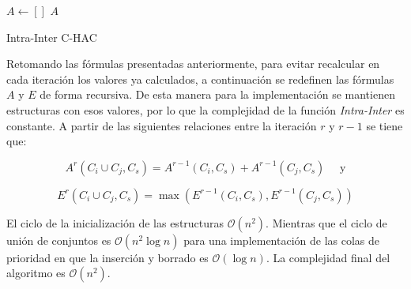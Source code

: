 \begin{center}
	\begin{algorithm}[H]
	\DontPrintSemicolon
	\SetAlgoLined
		$A \leftarrow []$\;
		\Return $A$\;
	\caption{Intra-Inter C-HAC}\label{alg:Intra-Inter C-HAC}
	\end{algorithm}
\end{center}

Retomando las fórmulas presentadas anteriormente, para evitar recalcular en cada iteración los valores ya calculados, a continuación se redefinen las fórmulas $A$ y $E$ de forma recursiva. De esta manera para la implementación se mantienen estructuras con esos valores, por lo que la complejidad de la función \textit{Intra-Inter} es constante. A partir de las siguientes relaciones entre la iteración $r$ y $r-1$ se tiene que:

$$A^r(C_i \cup C_j, C_s) = A^{r-1}(C_i,C_s) + A^{r-1}(C_j,C_s) \quad \mbox{ y}$$

$$E^r(C_i \cup C_j,C_s) = \max (E^{r-1}(C_i,C_s),E^{r-1}(C_j,C_s))$$

El ciclo de la inicialización de las estructuras $\mathcal{O}(n^{2})$. Mientras que el ciclo de unión de conjuntos es $\mathcal{O}(n^{2}\log n)$ para una implementación de las colas de prioridad en que la inserción y borrado es $\mathcal{O}(\log n)$. La complejidad final del algoritmo es $\mathcal{O}(n^{2})$.

